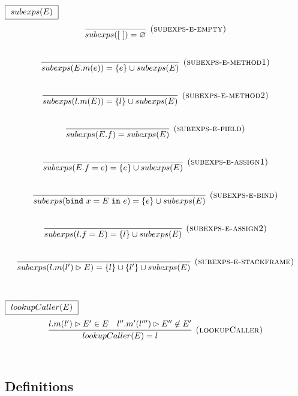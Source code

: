 \documentclass{llncs}
\newcommand{\keywadj}[1]{\mathtt{#1}}
\newcommand{\keyw}[1]{\keywadj{#1}~}
\begin{document}
$\fbox{$~subexps(E)~$}$
\[
\begin{array}{c}
\infer[\textsc{(subexps-e-empty)}]
  {subexps([~]) = \varnothing}
  {}\\[5ex]
\infer[\textsc{(subexps-e-method1)}]
  {subexps(E.m(e)) = \{ e \} \cup subexps(E)}
  {}\\[5ex]
  
\infer[\textsc{(subexps-e-method2)}]
  {subexps(l.m(E)) = \{ l \} \cup subexps(E)}
  {}\\[5ex]
\infer[\textsc{(subexps-e-field)}]
  {subexps(E.f) = subexps(E)}
  {}\\[5ex]

\infer[\textsc{(subexps-e-assign1)}]
  {subexps(E.f = e) = \{ e \} \cup subexps(E)}
  {}\\[5ex]
\infer[\textsc{(subexps-e-bind)}]
  {subexps(\keyw{bind} x = E~\keyw{in} e) = \{ e \} \cup subexps(E)}
  {}\\[5ex]  

\infer[\textsc{(subexps-e-assign2)}]
  {subexps(l.f = E) = \{ l \} \cup subexps(E)}
  {}\\[5ex]
\infer[\textsc{(subexps-e-stackframe)}]
  {subexps(l.m(l') \rhd E) = \{ l \} \cup \{ l' \} \cup subexps(E)}
  {}\\[5ex]
\end{array}
\]

$\fbox{$~lookupCaller(E)~$}$
\[
\begin{array}{c}
\infer[\textsc{(lookupCaller)}]
  {lookupCaller(E) = l}
  {l.m(l') \rhd E' \in E & l''.m'(l''') \rhd E'' \not\in E'}\\[5ex]
\end{array}
\]

\newpage
\subsection{Definitions}
\label{sec:definitions}
\end{document}
